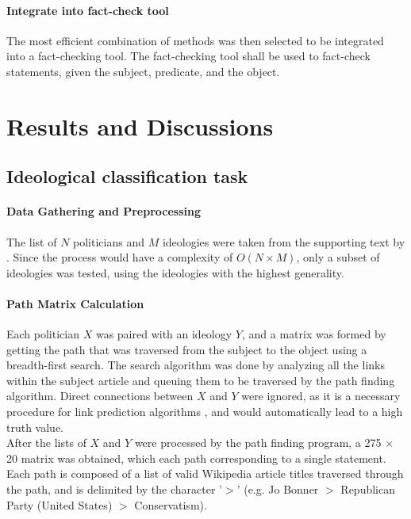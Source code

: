 \documentclass[10pt,11pt,12pt,oneside]{book}
\begin{document}
\subsubsection{Integrate into fact-check tool}
The most efficient combination of methods was then selected to be integrated into a fact-checking tool. The fact-checking tool shall be used to fact-check statements, given the subject, predicate, and the object.	

\chapter{Results and Discussions}

\section{Ideological classification task}

\subsubsection{Data Gathering and Preprocessing}

The list of $ N $ politicians and $ M $ ideologies were taken from the supporting text by \cite{ciampaglia2015computational}. Since the process would have a complexity of $ O(N \times M) $, only a subset of ideologies was tested, using the ideologies with the highest generality. 

\subsubsection{Path Matrix Calculation}
Each politician $ X $ was paired with an ideology $ Y $, and a matrix was formed by getting the path that was traversed from the subject to the object using a breadth-first search. The search algorithm was done by analyzing all the links within the subject article and queuing them to be traversed by the path finding algorithm. Direct connections between $ X $ and $ Y $ were ignored, as it is a necessary procedure for link prediction algorithms  \cite{liben-nowell_kleinberg_2007}, and would automatically lead to a high truth value.\\ 

After the lists of $ X $ and $ Y $ were processed by the path finding program, a 275 $\times$ 20 matrix was obtained, which each path corresponding to a single statement. Each path is composed of a list of valid Wikipedia article titles traversed through the path, and is delimited by the character '$>$' (e.g. Jo Bonner $>$ Republican Party (United States) $>$ Conservatism).
\end{document}
